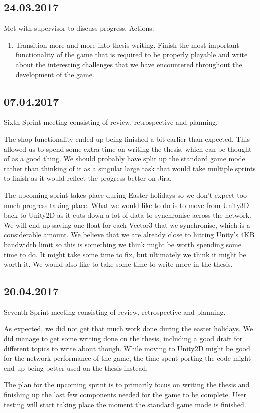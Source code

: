 \subsection*{24.03.2017}
Met with supervisor to discuss progress. Actions:
\begin{enumerate}
    \item Transition more and more into thesis writing. Finish the most important functionality of the game that is required to be properly playable and write about the interesting challenges that we have encountered throughout the development of the game. 
\end{enumerate}

\subsection*{07.04.2017}
Sixth Sprint meeting consisting of review, retrospective and planning.

The shop functionality ended up being finished a bit earlier than expected. This allowed us to spend some extra time on writing the thesis, which can be thought of as a good thing.
We should probably have split up the standard game mode rather than thinking of it as a singular large task that would take multiple sprints to finish as it would reflect the progress better on Jira. 

The upcoming sprint takes place during Easter holidays so we don't expect too much progress taking place. What we would like to do is to move from Unity3D back to Unity2D as it cuts down a lot of data to synchronise across the network. We will end up saving one float for each Vector3 that we synchronise, which is a considerable amount. We believe that we are already close to hitting Unity's 4KB bandwidth limit so this is something we think might be worth spending some time to do. It might take some time to fix, but ultimately we think it might be worth it.
We would also like to take some time to write more in the thesis. 

\subsection*{20.04.2017}
Seventh Sprint meeting consisting of review, retrospective and planning. 

As expected, we did not get that much work done during the easter holidays. We did manage to get some writing done on the thesis, including a good draft for different topics to write about though. While moving to Unity2D might be good for the network performance of the game, the time spent porting the code might end up being better used on the thesis instead. 

The plan for the upcoming sprint is to primarily focus on writing the thesis and finishing up the last few components needed for the game to be complete. User testing will start taking place the moment the standard game mode is finished.